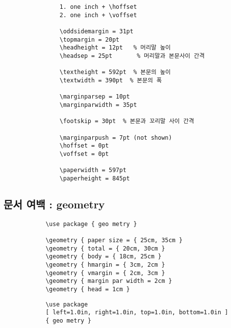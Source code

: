 \documentclass[12pt,a4paper]{book}
\begin{document}
		\singlespacing
		\setlength{\fboxsep}{12pt}
		\begin{boxedminipage}[c]{1.0\linewidth}
			\begin{verbatim}
				1. one inch + \hoffset
				2. one inch + \voffset
				
				\oddsidemargin = 31pt
				\topmargin = 20pt
				\headheight = 12pt   % 머리말 높이
				\headsep = 25pt       % 머리말과 본문사이 간격
				
				\textheight = 592pt  % 본문의 높이
				\textwidth = 390pt	% 본문의 폭
				
				\marginparsep = 10pt
				\marginparwidth = 35pt
				
				\footskip = 30pt  % 본문과 꼬리말 사이 간격
				
				\marginparpush = 7pt (not shown)
				\hoffset = 0pt
				\voffset = 0pt
				
				\paperwidth = 597pt
				\paperheight = 845pt
			\end{verbatim} 
		\end{boxedminipage}
		\doublespacing


	\newpage  
	\subsection*{문서 여백 : geometry }

		\singlespacing
		\setlength{\fboxsep}{12pt}
		\begin{boxedminipage}[c]{1.0\linewidth}
			\begin{verbatim}
			\use package { geo metry }
			
			\geometry { paper size = { 25cm, 35cm }
			\geometry { total = { 20cm, 30cm }
			\geometry { body = { 18cm, 25cm }
			\geometry { hmargin = { 3cm, 2cm }
			\geometry { vmargin = { 2cm, 3cm }
			\geometry { margin par width = 2cm }
			\geometry { head = 1cm }
			\end{verbatim} 
		\end{boxedminipage}
		\doublespacing
	
		\singlespacing
		\setlength{\fboxsep}{12pt}
		\begin{boxedminipage}[c]{1.0\linewidth}
			\begin{verbatim}
			\use package 
			[ left=1.0in, right=1.0in, top=1.0in, bottom=1.0in ]
			{ geo metry }
			\end{verbatim} 
		\end{boxedminipage}
		\doublespacing
\end{document}

